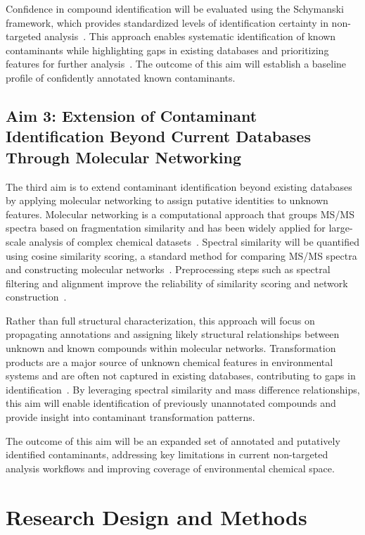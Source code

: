 \documentclass[11pt]{article}
\begin{document}
\begin{doublespace}
    Confidence in compound identification will be evaluated using the Schymanski framework, which provides standardized levels of identification certainty in non-targeted analysis~\cite{Schymanski2014}.
    This approach enables systematic identification of known contaminants while highlighting gaps in existing databases and prioritizing features for further analysis~\cite{Manz, Chao2025}.
    The outcome of this aim will establish a baseline profile of confidently annotated known contaminants.


    \subsection{Aim 3: Extension of Contaminant Identification Beyond Current Databases Through Molecular Networking}
    The third aim is to extend contaminant identification beyond existing databases by applying molecular networking to assign putative identities to unknown features.
    Molecular networking is a computational approach that groups MS/MS spectra based on fragmentation similarity and has been widely applied for large-scale analysis of complex chemical datasets~\cite{Wang2016}.
    Spectral similarity will be quantified using cosine similarity scoring, a standard method for comparing MS/MS spectra and constructing molecular networks~\cite{Schmid2021, Bittremieux2022}.
    Preprocessing steps such as spectral filtering and alignment improve the reliability of similarity scoring and network construction~\cite{DallaValle2025, Olivon2017}.

    Rather than full structural characterization, this approach will focus on propagating annotations and assigning likely structural relationships between unknown and known compounds within molecular networks.
    Transformation products are a major source of unknown chemical features in environmental systems and are often not captured in existing databases, contributing to gaps in identification~\cite{Zahn2024, Ma2025}.
    By leveraging spectral similarity and mass difference relationships, this aim will enable identification of previously unannotated compounds and provide insight into contaminant transformation patterns.

    The outcome of this aim will be an expanded set of annotated and putatively identified contaminants, addressing key limitations in current non-targeted analysis workflows and improving coverage of environmental chemical space.


\section{Research Design and Methods}

\end{doublespace}
\end{document}
